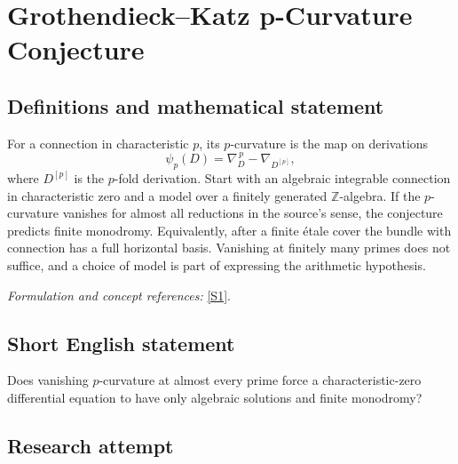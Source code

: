 \documentclass[11pt,a4paper]{article}
\newcommand{\Z}{\mathbb{Z}}
\newcommand{\sref}[2]{\hyperlink{source:#1:#2}{[S#2]}}
\newif\ifshowcatalogue
\newcommand{\cataloguescope}[1]{\ifshowcatalogue
 \paragraph{Exact scope in the supplied catalogue.}
 \begin{quote}\small #1\end{quote}\fi}
\numberwithin{equation}{section}
\begin{document}
\setcounter{section}{117}
\clearpage
\section{\texorpdfstring{Grothendieck–Katz p-Curvature Conjecture}{Grothendieck–Katz p-Curvature Conjecture}}\label{118}
\subsection{Definitions and mathematical statement}
For a connection in characteristic $p$, its $p$-curvature is the map on derivations
\[
 \psi_p(D)=\nabla_D^{\,p}-\nabla_{D^{[p]}},
\]
where $D^{[p]}$ is the $p$-fold derivation. Start with an algebraic integrable connection in characteristic zero and a model over a finitely generated $\Z$-algebra. If the $p$-curvature vanishes for almost all reductions in the source's sense, the conjecture predicts finite monodromy. Equivalently, after a finite étale cover the bundle with connection has a full horizontal basis. Vanishing at finitely many primes does not suffice, and a choice of model is part of expressing the arithmetic hypothesis.
\par\smallskip\textit{Formulation and concept references:} \sref{118}{1}.
\cataloguescope{Let X be a smooth connected complex variety and (V,\ensuremath{\nabla}) an algebraic vector bundle with integrable connection, spread out over a finitely generated Z-algebra. Prove that if the reductions have zero p-curvature for almost all primes, then (V,\ensuremath{\nabla}) has a full set of algebraic solutions, equivalently becomes trivial on a finite étale cover and has finite monodromy.}
\subsection{Short English statement}
Does vanishing $p$-curvature at almost every prime force a characteristic-zero differential equation to have only algebraic solutions and finite monodromy?
\subsection{Research attempt}
\end{document}
